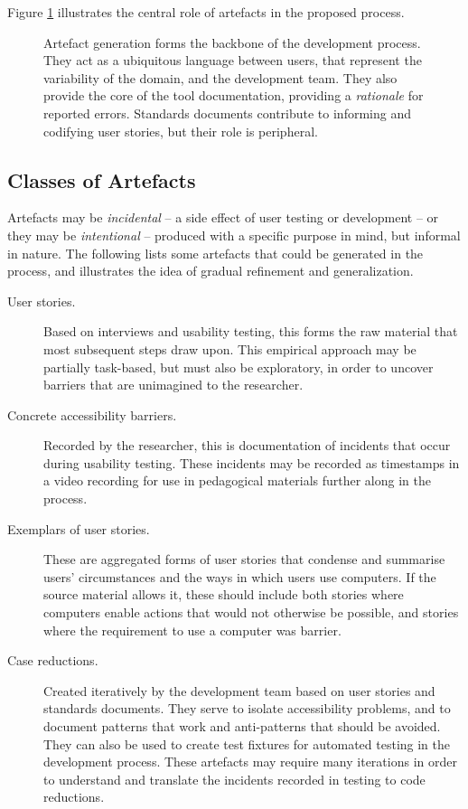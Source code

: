 
Figure \ref{fig:devprocess} illustrates the central role of artefacts in the proposed process.

\begin{figure}
\center

\label{fig:devprocess}
\caption{Artefact generation forms the backbone of the development process. They act as a ubiquitous language between users, that represent the variability of the domain, and the development team. They also provide the core of the tool documentation, providing a \emph{rationale} for reported errors. Standards documents contribute to informing and codifying user stories, but their role is peripheral.}
\end{figure}

\subsection{Classes of Artefacts} %
\label{sub:classes_of_artefacts}

Artefacts may be \emph{incidental} -- a side effect of user testing or development -- or they may be \emph{intentional} -- produced with a specific purpose in mind, but informal in nature. The following lists some artefacts that could be generated in the process, and illustrates the idea of gradual refinement and generalization.

\begin{description}
	\item[User stories.] Based on interviews and usability testing, this forms the raw material that most subsequent steps draw upon. This empirical approach may be partially task-based, but must also be exploratory, in order to uncover barriers that are unimagined to the researcher.
	\item[Concrete accessibility barriers.] Recorded by the researcher, this is documentation of incidents that occur during usability testing. These incidents may be recorded as timestamps in a video recording for use in pedagogical materials further along in the process.
	\item[Exemplars of user stories.] These are aggregated forms of user stories that condense and summarise users' circumstances and the ways in which users use computers. If the source material allows it, these should include both stories where computers enable actions that would not otherwise be possible, and stories where the requirement to use a computer was barrier.
	\item[Case reductions.] Created iteratively by the development team based on user stories and standards documents. They serve to isolate accessibility problems, and to document patterns that work and anti-patterns that should be avoided. They can also be used to create test fixtures for automated testing in the development process. These artefacts may require many iterations in order to understand and translate the incidents recorded in testing to code reductions.
\end{description}




